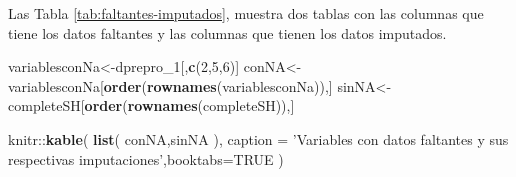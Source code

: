 \documentclass[]{book}
\newenvironment{Shaded}{\begin{snugshade}}{\end{snugshade}}
\newcommand{\KeywordTok}[1]{\textcolor[rgb]{0.13,0.29,0.53}{\textbf{{#1}}}}
\newcommand{\DataTypeTok}[1]{\textcolor[rgb]{0.13,0.29,0.53}{{#1}}}
\newcommand{\DecValTok}[1]{\textcolor[rgb]{0.00,0.00,0.81}{{#1}}}
\newcommand{\StringTok}[1]{\textcolor[rgb]{0.31,0.60,0.02}{{#1}}}
\newcommand{\OtherTok}[1]{\textcolor[rgb]{0.56,0.35,0.01}{{#1}}}
\newcommand{\NormalTok}[1]{{#1}}
\begin{document}
Las Tabla \ref{tab:faltantes-imputados}, muestra dos tablas con las
columnas que tiene los datos faltantes y las columnas que tienen los
datos imputados.

\begin{Shaded}
\begin{Highlighting}[]
\NormalTok{variablesconNa<-dprepro_1[,}\KeywordTok{c}\NormalTok{(}\DecValTok{2}\NormalTok{,}\DecValTok{5}\NormalTok{,}\DecValTok{6}\NormalTok{)]}
\NormalTok{conNA<-variablesconNa[}\KeywordTok{order}\NormalTok{(}\KeywordTok{rownames}\NormalTok{(variablesconNa)),]}
\NormalTok{sinNA<-completeSH[}\KeywordTok{order}\NormalTok{(}\KeywordTok{rownames}\NormalTok{(completeSH)),]}

\NormalTok{knitr::}\KeywordTok{kable}\NormalTok{(}
  \KeywordTok{list}\NormalTok{(}
    \NormalTok{conNA,sinNA}
  \NormalTok{),}
  \DataTypeTok{caption =} \StringTok{'Variables con datos faltantes y sus respectivas imputaciones'}\NormalTok{,}\DataTypeTok{booktabs=}\OtherTok{TRUE}
\NormalTok{)}
\end{Highlighting}
\end{Shaded}
\end{document}
